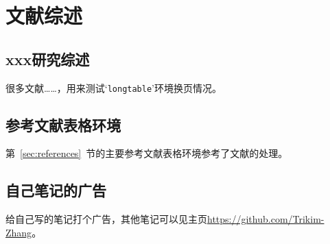 \section{文献综述}\label{sec:referenceSummary}
\subsection{xxx研究综述}
很多文献\cite{almarza1998-student,goosens1994-latex,spivak1988-can,diaozhenren2024-da}……，用来测试`\verb|longtable|'环境换页情况。
\subsection{参考文献表格环境}
第~\ref{sec:references}~节的主要参考文献表格环境参考了文献\parencite{hu_shidong2023-latex}的处理。
\subsection{自己笔记的广告}
给自己写的笔记打个广告\cite{zhangxinhang2023-ren}，其他笔记可以见主页\href{https://github.com/Trikim-Zhang}{https://github.com/Trikim-Zhang}。
